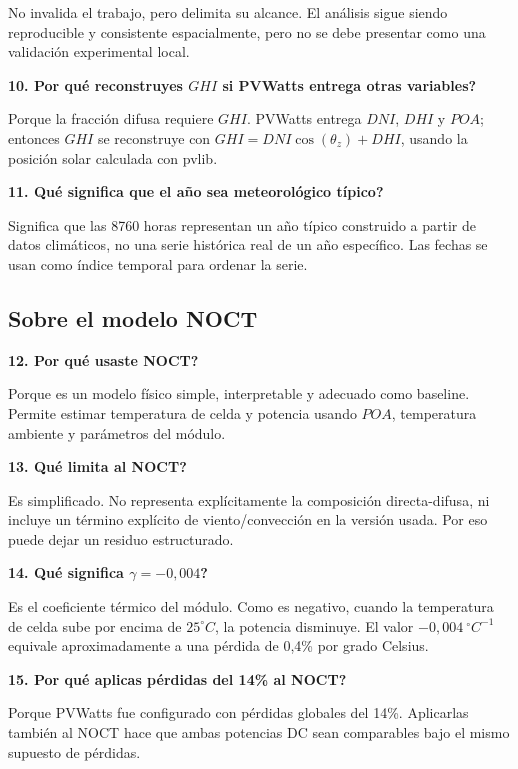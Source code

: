 \documentclass[11pt, letterpaper]{article}
\begin{document}
No invalida el trabajo, pero delimita su alcance. El an\'alisis sigue siendo reproducible y consistente espacialmente, pero no se debe presentar como una validaci\'on experimental local.

\textbf{10. \textquestiondown Por qu\'e reconstruyes \(GHI\) si PVWatts entrega otras variables?}

Porque la fracci\'on difusa requiere \(GHI\). PVWatts entrega \(DNI\), \(DHI\) y \(POA\); entonces \(GHI\) se reconstruye con \(GHI=DNI\cos(\theta_z)+DHI\), usando la posici\'on solar calculada con pvlib.

\textbf{11. \textquestiondown Qu\'e significa que el a\~no sea meteorol\'ogico t\'ipico?}

Significa que las 8760 horas representan un a\~no t\'ipico construido a partir de datos clim\'aticos, no una serie hist\'orica real de un a\~no espec\'ifico. Las fechas se usan como \'indice temporal para ordenar la serie.

\subsection{Sobre el modelo NOCT}

\textbf{12. \textquestiondown Por qu\'e usaste NOCT?}

Porque es un modelo f\'isico simple, interpretable y adecuado como baseline. Permite estimar temperatura de celda y potencia usando \(POA\), temperatura ambiente y par\'ametros del m\'odulo.

\textbf{13. \textquestiondown Qu\'e limita al NOCT?}

Es simplificado. No representa expl\'icitamente la composici\'on directa-difusa, ni incluye un t\'ermino expl\'icito de viento/convecci\'on en la versi\'on usada. Por eso puede dejar un residuo estructurado.

\textbf{14. \textquestiondown Qu\'e significa \(\gamma=-0{,}004\)?}

Es el coeficiente t\'ermico del m\'odulo. Como es negativo, cuando la temperatura de celda sube por encima de \(25^\circ C\), la potencia disminuye. El valor \(-0{,}004\ ^\circ C^{-1}\) equivale aproximadamente a una p\'erdida de 0,4\% por grado Celsius.

\textbf{15. \textquestiondown Por qu\'e aplicas p\'erdidas del 14\% al NOCT?}

Porque PVWatts fue configurado con p\'erdidas globales del 14\%. Aplicarlas tambi\'en al NOCT hace que ambas potencias DC sean comparables bajo el mismo supuesto de p\'erdidas.
\end{document}
